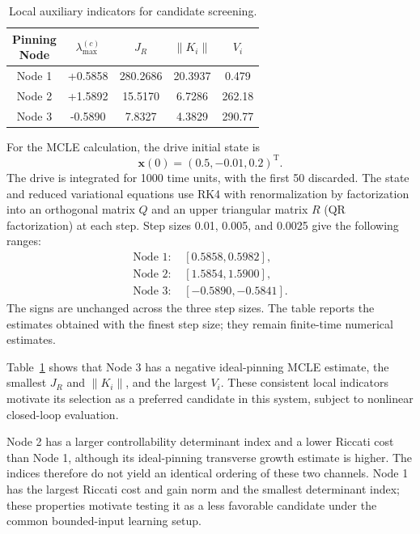 \documentclass[a4paper,fleqn]{cas-dc}
\theoremstyle{plain}
\theoremstyle{definition}
\begin{document}
\begin{table}[pos=htbp,width=\linewidth]
	\centering
	\setlength{\tabcolsep}{3pt}
	\renewcommand{\arraystretch}{1.12}
	\caption{Local auxiliary indicators for candidate screening.}
	\label{tab:local_node_metrics}
	\begin{tabular}{@{}ccccc@{}}
		\toprule
		\makecell{Pinning\\Node} 
		& $\lambda_{\max}^{(c)}$ 
		& $J_R$ 
		& $\|K_i\|$ 
		& $V_i$ \\
		\midrule
		Node 1 & +0.5858 & 280.2686 & 20.3937 & 0.479 \\
		Node 2 & +1.5892 & 15.5170 & 6.7286 & 262.18 \\
		Node 3 & -0.5890 & 7.8327 & 4.3829 & 290.77 \\
		\bottomrule
	\end{tabular}
\end{table}

For the MCLE calculation, the drive initial state is
\[
\mathbf{x}(0)=(0.5,-0.01,0.2)^{\mathrm T}.
\]
The drive is integrated for 1000 time units, with the first 50 discarded. The state and reduced variational equations use RK4 with renormalization by factorization into an orthogonal matrix $Q$ and an upper triangular matrix $R$ (QR factorization) at each step. Step sizes 0.01, 0.005, and 0.0025 give the following ranges:
\[
\begin{aligned}
\text{Node 1: }&[0.5858,0.5982],\\
\text{Node 2: }&[1.5854,1.5900],\\
\text{Node 3: }&[-0.5890,-0.5841].
\end{aligned}
\]
The signs are unchanged across the three step sizes. The table reports the estimates obtained with the finest step size; they remain finite-time numerical estimates.

Table~\ref{tab:local_node_metrics} shows that Node 3 has a negative ideal-pinning MCLE estimate, the smallest $J_R$ and $\|K_i\|$, and the largest $V_i$. These consistent local indicators motivate its selection as a preferred candidate in this system, subject to nonlinear closed-loop evaluation.

Node 2 has a larger controllability determinant index and a lower Riccati cost than Node 1, although its ideal-pinning transverse growth estimate is higher. The indices therefore do not yield an identical ordering of these two channels. Node 1 has the largest Riccati cost and gain norm and the smallest determinant index; these properties motivate testing it as a less favorable candidate under the common bounded-input learning setup.
\end{document}
